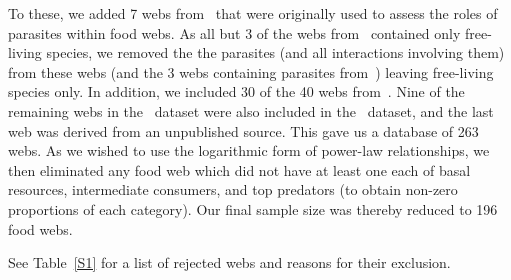 \documentclass[12pt]{article}
\begin{document}
  To these, we added 7 webs from~\citet{Dunne2013} that were originally used
  to assess the roles of parasites within food webs. As all but 3 of the webs
  from~\citet{GlobalWeb} contained only free-living species, we removed the
  the parasites (and all interactions involving them) from these webs (and the
  3 webs containing parasites from~\citet{GlobalWeb}) leaving free-living
  species only. In addition, we included 30 of the 40 webs
  from~\citet{Riede2011}. Nine of the
  remaining webs in the~\citet{Riede2011} dataset were also included in
  the~\citet{GlobalWeb}  dataset, and the last web was derived from an
  unpublished source. This gave us a database of 263 webs. As we wished to use
  the logarithmic form of power-law relationships, we then eliminated any food
  web which did not have at least one each of basal resources, intermediate
  consumers, and top predators (to obtain  non-zero proportions of each
  category). Our final sample size was thereby reduced to 196 food webs.



 See Table~\ref{S1} for a list of rejected webs and reasons for their
  exclusion. 
\end{document}
